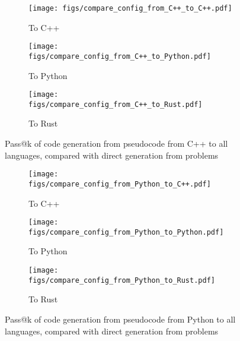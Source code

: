 \begin{figure*}[t]
\centering
    \begin{subfigure}[b]{\textwidth}
         \centering
         \texttt{[image: figs/compare\_config\_from\_C++\_to\_C++.pdf]} %
         \caption{To C++}
    \end{subfigure}
    \begin{subfigure}[b]{\textwidth}
         \centering
         \texttt{[image: figs/compare\_config\_from\_C++\_to\_Python.pdf]}
         \caption{To Python}
    \end{subfigure}
    \begin{subfigure}[b]{\textwidth}
         \centering
         \texttt{[image: figs/compare\_config\_from\_C++\_to\_Rust.pdf]}
         \caption{To Rust}
    \end{subfigure}
  \caption {Pass@k of code generation from pseudocode from C++ to all languages, compared with direct generation from problems}
  \label{fig:compare-config-cpp}
\end{figure*}

\begin{figure*}[t]
\centering
    \begin{subfigure}[b]{\textwidth}
         \centering
         \texttt{[image: figs/compare\_config\_from\_Python\_to\_C++.pdf]} %
         \caption{To C++}
    \end{subfigure}
    \begin{subfigure}[b]{\textwidth}
         \centering
         \texttt{[image: figs/compare\_config\_from\_Python\_to\_Python.pdf]}
         \caption{To Python}
    \end{subfigure}
    \begin{subfigure}[b]{\textwidth}
         \centering
         \texttt{[image: figs/compare\_config\_from\_Python\_to\_Rust.pdf]}
         \caption{To Rust}
    \end{subfigure}
  \caption {Pass@k of code generation from pseudocode from Python to all languages, compared with direct generation from problems}
  \label{fig:compare-config-python}
\end{figure*}

